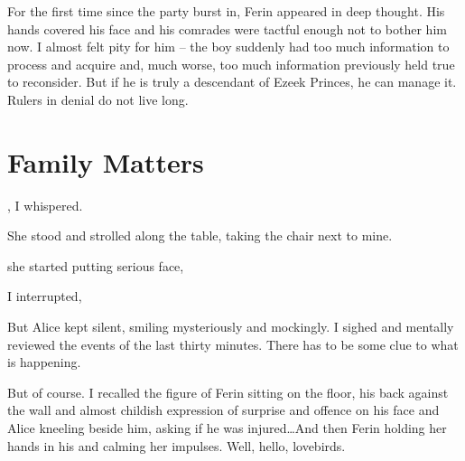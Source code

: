 For the first time since the party burst in, Ferin appeared in deep thought. His hands covered his face and his comrades were tactful enough not to bother him now. I almost felt pity for him -- the boy suddenly had too much information to process and acquire and, much worse, too much information previously held true to reconsider. But if he is truly a descendant of Ezeek Princes, he can manage it. Rulers in denial do not live long.

\section{Family Matters}

, I whispered. 

She stood and strolled along the table, taking the chair next to mine.



 she started putting serious face, 

 I interrupted, 

But Alice kept silent, smiling mysteriously and mockingly. I sighed and mentally reviewed the events of the last thirty minutes. There has to be some clue to what is happening.

But of course. I recalled the figure of Ferin sitting on the floor, his back against the wall and almost childish expression of surprise and offence on his face and Alice kneeling beside him, asking if he was injured\dots And then Ferin holding her hands in his and calming her impulses. Well, hello, lovebirds.

